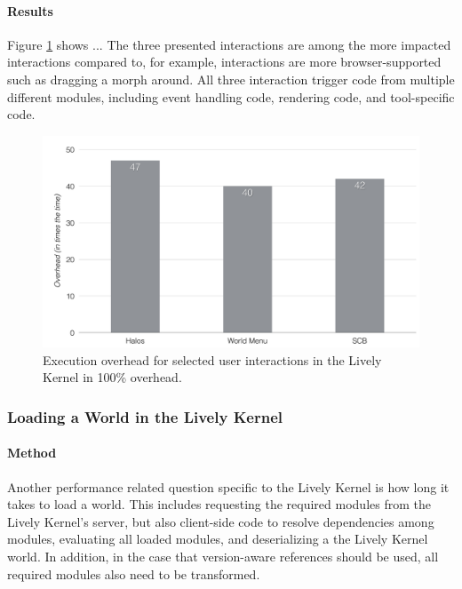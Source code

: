 \paragraph{Results}
Figure \ref{fig:LivelyInteractionsOverhead} shows ...
The three presented interactions are among the more impacted interactions compared to, for example, interactions are more browser-supported such as dragging a morph around.
All three interaction trigger code from multiple different modules, including event handling code, rendering code, and tool-specific code.

\begin{figure}[h]
    \centering
    \includegraphics[width=\textwidth]{figures/6_evaluation/3_LivelyInteractionsOverhead.pdf}
    \caption{Execution overhead for selected user interactions in the Lively Kernel in 100\% overhead.}
    \label{fig:LivelyInteractionsOverhead}
\end{figure}


\subsubsection{Loading a World in the Lively Kernel}

\paragraph{Method}
Another performance related question specific to the Lively Kernel is how long it takes to load a world.
This includes requesting the required modules from the Lively Kernel's server, but also client-side code to resolve dependencies among modules, evaluating all loaded modules, and deserializing a the Lively Kernel world.
In addition, in the case that version-aware references should be used, all required modules also need to be transformed.

